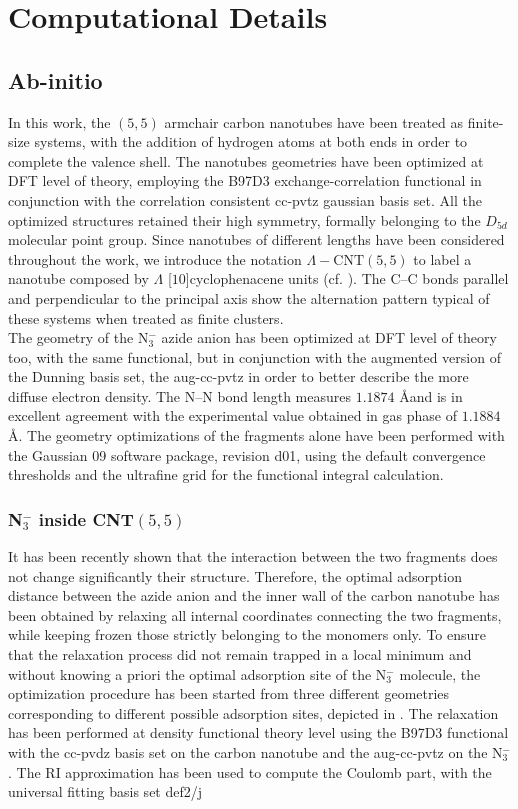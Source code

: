 \documentclass{article}
\begin{document}
\section{Computational Details}

\subsection{Ab-initio}
In this work, the $(5,5)$ armchair carbon nanotubes have been treated as finite-size systems, with the addition of hydrogen atoms at both ends in order to complete the valence shell.
The nanotubes geometries have been optimized at DFT level of theory, employing the B97D3 exchange-correlation functional\cite{Grimme2010} in conjunction with the correlation consistent cc-pvtz gaussian basis set\cite{DunningJr1989}.
All the optimized structures retained their high symmetry, formally belonging to the $D_{5d}$ molecular point group.
Since nanotubes of different lengths have been considered throughout the work, we introduce the notation $\Lambda - \text{CNT}(5,5)$ to label a nanotube composed by $\Lambda$ [$10$]cyclophenacene units (cf. \Cref{}).
The C--C bonds parallel and perpendicular to the principal axis show the alternation pattern typical of these systems when treated as finite clusters\cite{Zhou2004,Galano2006}.\\
The geometry of the N$_3^-$ azide anion has been optimized at DFT level of theory too, with the same functional, but in conjunction with the augmented version of the Dunning basis set, the aug-cc-pvtz in order to better describe the more diffuse electron density.
The N--N bond length measures $1.1874$ \AA and is in excellent agreement with the experimental value obtained in gas phase of $1.1884$ \AA\cite{Polak1987}.
The geometry optimizations of the fragments alone have been performed with the Gaussian 09 software package, revision d01\cite{g09}, using the default convergence thresholds and the ultrafine grid for the functional integral calculation.

\subsubsection{N$_3^-$ inside CNT$(5,5)$}
It has been recently shown\cite{Battaglia2017a} that the interaction between the two fragments does not change significantly their structure.
Therefore, the optimal adsorption distance between the azide anion and the inner wall of the carbon nanotube has been obtained by relaxing all internal coordinates connecting the two fragments, while keeping frozen those strictly belonging to the monomers only.
To ensure that the relaxation process did not remain trapped in a local minimum and without knowing a priori the optimal adsorption site of the N$_3^-$ molecule, the optimization procedure has been started from three different geometries corresponding to different possible adsorption sites, depicted in \Cref{}.
The relaxation has been performed at density functional theory level using the B97D3 functional with the cc-pvdz basis set on the carbon nanotube and the aug-cc-pvtz on the N$_3^-$. The RI approximation has been used to compute the Coulomb part, with the universal fitting basis set def2/j\cite{weige}
\end{document}
